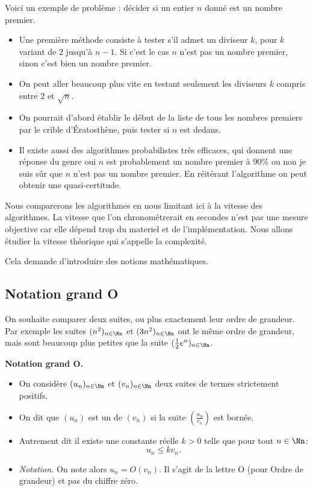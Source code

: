\documentclass[11pt,class=report,crop=false]{standalone}
\begin{document}
Voici un exemple de problème : décider si un entier $n$ donné est un nombre premier.
\begin{itemize}
  \item Une première méthode consiste à tester s'il admet un diviseur $k$, pour $k$ variant de $2$ jusqu'à $n-1$. Si c'est le cas $n$ n'est pas un nombre premier, sinon c'est bien un nombre premier.
  \item On peut aller beaucoup plus vite en testant seulement les diviseurs $k$
  compris entre $2$ et $\sqrt n$.
  \item On pourrait d'abord établir le début de la liste de tous les nombres premiers par le crible d'Ératosthène, puis tester si $n$ est dedans.
  \item Il existe aussi des algorithmes probabilistes très efficaces,
  qui donnent une réponse du genre \og{}oui $n$ est probablement un nombre premier à $90\%$\fg{} ou \og{}non je suis sûr que $n$ n'est pas un nombre premier\fg{}.
  En réitérant l'algorithme on peut obtenir une quasi-certitude.
\end{itemize}

Nous comparerons les algorithmes en nous limitant ici à la \og{}vitesse\fg{} des algorithmes.
La vitesse que l'on chronométrerait en secondes n'est pas une mesure objective car elle dépend trop du materiel et de l'implémentation. Nous allons étudier la vitesse théorique qui s'appelle la \og{}complexité\fg{}.

Cela demande d'introduire des notions mathématiques.


\subsection{Notation \og{}grand O\fg{}}

On souhaite comparer deux suites, ou plus exactement leur ordre de grandeur. Par exemple les suites $(n^2)_{n\in\Nn}$ et $(3n^2)_{n\in\Nn}$ ont le même ordre de grandeur, mais sont beaucoup plus petites que la suite $(\frac12 e^n)_{n\in\Nn}$. 

\textbf{Notation \og{}grand O\fg{}.}
\begin{itemize}
	\item On considère $(u_n)_{n\in\Nn}$ et $(v_n)_{n\in\Nn}$ deux suites de termes strictement positifs.
	\item On dit que $(u_n)$ est un  de $(v_n)$ si la suite $\left(\frac{u_n}{v_n}\right)$ est bornée.
    \item Autrement dit il existe une constante réelle $k>0$ telle que pour tout $n\in \Nn$:
$$u_n \le k v_n.$$
    \item \emph{Notation.} On note alors $u_n = O(v_n)$. Il s'agit de la lettre \og{}O\fg{} (pour Ordre de grandeur) et pas du chiffre zéro.
\end{itemize}
\end{document}
